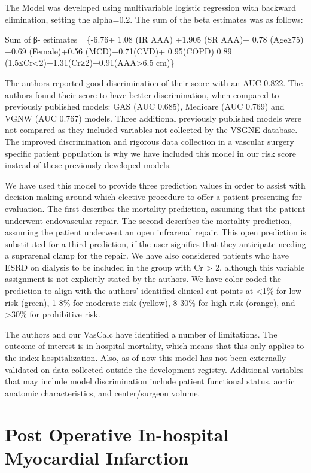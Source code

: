 \documentclass[
]{book}
\begin{document}
The Model was developed using multivariable logistic regression with backward elimination, setting the alpha=0.2. The sum of the beta estimates was as follows:

Sum of β- estimates= \{-6.76+ 1.08 (IR AAA) +1.905 (SR AAA)+ 0.78 (Age≥75) +0.69 (Female)+0.56 (MCD)+0.71(CVD)+ 0.95(COPD) 0.89 (1.5≤Cr\textless2)+1.31(Cr≥2)+0.91(AAA\textgreater6.5 cm)\}

The authors reported good discrimination of their score with an AUC 0.822. The authors found their score to have better discrimination, when compared to previously published models: GAS (AUC 0.685), Medicare (AUC 0.769) and VGNW (AUC 0.767) models. Three additional previously published models were not compared as they included variables not collected by the VSGNE database. The improved discrimination and rigorous data collection in a vascular surgery specific patient population is why we have included this model in our risk score instead of these previously developed models.

We have used this model to provide three prediction values in order to assist with decision making around which elective procedure to offer a patient presenting for evaluation. The first describes the mortality prediction, assuming that the patient underwent endovascular repair. The second describes the mortality prediction, assuming the patient underwent an open infrarenal repair. This open prediction is substituted for a third prediction, if the user signifies that they anticipate needing a suprarenal clamp for the repair. We have also considered patients who have ESRD on dialysis to be included in the group with Cr \textgreater{} 2, although this variable assignment is not explicitly stated by the authors. We have color-coded the prediction to align with the authors' identified clinical cut points at \textless1\% for low risk (green), 1-8\% for moderate risk (yellow), 8-30\% for high risk (orange), and \textgreater30\% for prohibitive risk.

The authors and our VasCalc have identified a number of limitations. The outcome of interest is in-hospital mortality, which means that this only applies to the index hospitalization. Also, as of now this model has not been externally validated on data collected outside the development registry. Additional variables that may include model discrimination include patient functional status, aortic anatomic characteristics, and center/surgeon volume.

\hypertarget{post-operative-in-hospital-myocardial-infarction}{%
\section{Post Operative In-hospital Myocardial Infarction}\label{post-operative-in-hospital-myocardial-infarction}}
\end{document}
